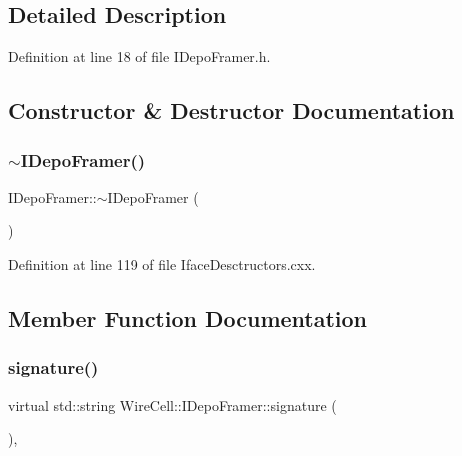 \subsection{Detailed Description}


Definition at line 18 of file I\+Depo\+Framer.\+h.



\subsection{Constructor \& Destructor Documentation}
\mbox{\label{class_wire_cell_1_1_i_depo_framer_ae30f98470a1f512cdc38e35799954052}} 
\subsubsection{\texorpdfstring{$\sim$\+I\+Depo\+Framer()}{~IDepoFramer()}}
{\footnotesize\ttfamily I\+Depo\+Framer\+::$\sim$\+I\+Depo\+Framer (\begin{DoxyParamCaption}{ }\end{DoxyParamCaption})\hspace{0.3cm}{\ttfamily [virtual]}}



Definition at line 119 of file Iface\+Desctructors.\+cxx.



\subsection{Member Function Documentation}
\mbox{\label{class_wire_cell_1_1_i_depo_framer_ad188e2d941d34583f13758689d0c331f}} 
\subsubsection{\texorpdfstring{signature()}{signature()}}
{\footnotesize\ttfamily virtual std\+::string Wire\+Cell\+::\+I\+Depo\+Framer\+::signature (\begin{DoxyParamCaption}{ }\end{DoxyParamCaption})\hspace{0.3cm}{\ttfamily [inline]}, {\ttfamily [virtual]}}



